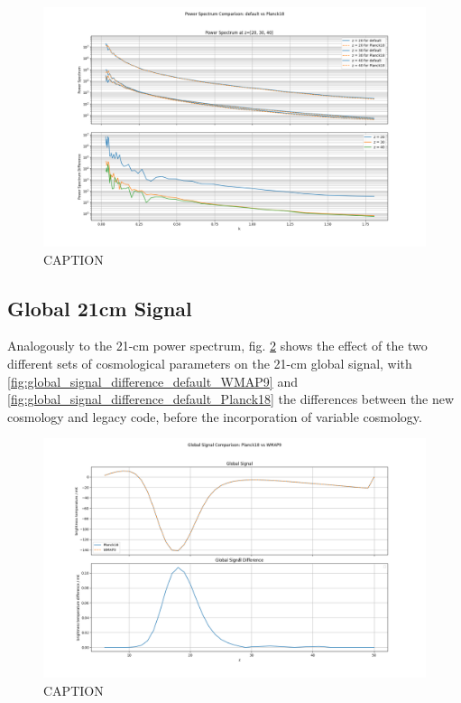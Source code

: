 \documentclass[floats,floatfix,showpacs,amssymb,prd,superscriptaddress,nofootinbib]{revtex4-2} %
\begin{document}
\begin{figure}[H]
    \centering
    \includegraphics[width=0.9\columnwidth]{images/simulation_results/power_spectrum_difference_default_Planck18.png}
    \caption{CAPTION}
    \label{fig:power_spectrum_difference_default_Planck18}
\end{figure}

\subsection{Global 21cm Signal}
Analogously to the 21-cm power spectrum, fig. \ref{fig:global_signal_difference_Planck18_WMAP9} shows the effect of the two different sets of cosmological parameters on the 21-cm global signal, with \ref{fig:global_signal_difference_default_WMAP9} and \ref{fig:global_signal_difference_default_Planck18} the differences between the new cosmology and legacy code, before the incorporation of variable cosmology. 

\newpage
\begin{figure}[H]
    \centering
    \includegraphics[width=0.9\columnwidth]{images/simulation_results/global_signal_difference_Planck18_WMAP9.png}
    \caption{CAPTION}
    \label{fig:global_signal_difference_Planck18_WMAP9}
\end{figure}
\end{document}
